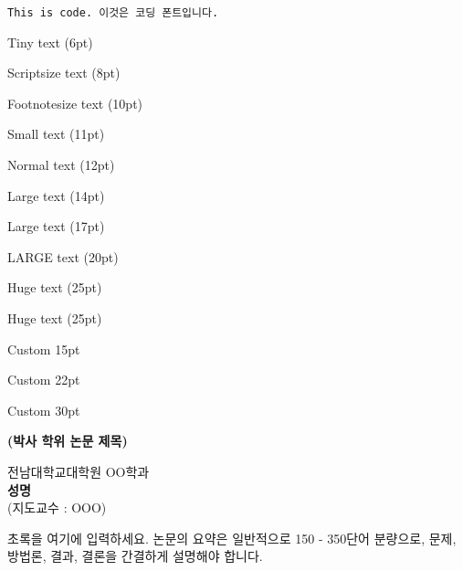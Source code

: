\texttt{This is code. 이것은 코딩 폰트입니다.}

{\tiny Tiny text (6pt)}

{\scriptsize Scriptsize text (8pt)}

{\footnotesize Footnotesize text (10pt)}

{\small Small text (11pt)}

\normalsize Normal text (12pt)

{\large Large text (14pt)}

{\Large Large text (17pt)}

{\LARGE LARGE text (20pt)}

{\huge Huge text (25pt)}

{\Huge Huge text (25pt)}

{\fontsize{15pt}{18pt}\selectfont Custom 15pt}

{\fontsize{22pt}{26pt}\selectfont Custom 22pt}

{\fontsize{30pt}{36pt}\selectfont Custom 30pt}

\newpage	
\cleardoublepage
{}
{}
\vspace*{0cm}
\begin{center}
{\LARGE\bfseries (박사 학위 논문 제목) \par}    
{\large	전남대학교대학원 OO학과}\\[1\baselineskip]
{\Large {\bfseries 성명 }\\[1\baselineskip] (지도교수 : OOO)}\\[3\baselineskip]
\end{center}

{\Large {}\par}
초록을 여기에 입력하세요. 논문의 요약은 일반적으로 150 - 350단어 분량으로, 문제, 방법론, 결과, 결론을 간결하게 설명해야 합니다.
